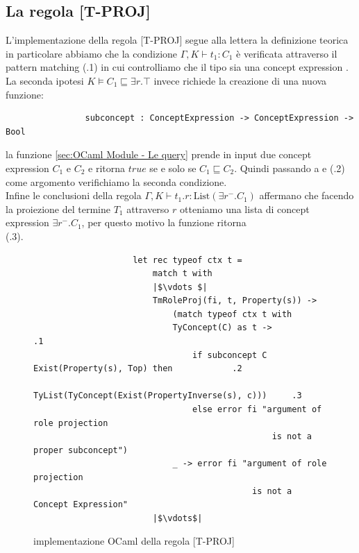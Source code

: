         \subsection{La regola [T-PROJ]}
            L'implementazione della regola [T-PROJ] segue alla lettera la definizione teorica in particolare abbiamo che la condizione $\Gamma,K \vdash t_1 : C_1$
            è verificata attraverso il pattern matching (.1) in cui controlliamo che il tipo  sia una concept expression . La seconda ipotesi
            $K \vDash C_1 \sqsubseteq \exists r . \top$ invece richiede la creazione di una nuova funzione:
            \begin{verbatim}
                subconcept : ConceptExpression -> ConceptExpression -> Bool
            \end{verbatim}
            la funzione  \ref{sec:OCaml Module - Le query} prende in input due concept expression $C_1$ e $C_2$ e ritorna $true$ se e solo se $C_1 \sqsubseteq C_2$. Quindi passando a 
             e  (.2) come argomento verifichiamo la seconda condizione.
            \\Infine le conclusioni della regola $\Gamma,K \vdash t_1.r : \textrm{List}(\exists r^- . C_1)$ affermano che facendo la proiezione del termine $T_1$ attraverso $r$
            otteniamo una lista di concept expression $\exists r^- . C_1$, per questo motivo la funzione  ritorna \\ (.3).
            \begin{figure}[h] 
                \begin{verbatim}
                    let rec typeof ctx t =
                        match t with
                        |$\vdots $|
                        TmRoleProj(fi, t, Property(s)) ->
                            (match typeof ctx t with
                            TyConcept(C) as t ->                                        .1
                                if subconcept C Exist(Property(s), Top) then            .2
                                    TyList(TyConcept(Exist(PropertyInverse(s), c)))     .3
                                else error fi "argument of role projection 
                                                is not a proper subconcept")
                            _ -> error fi "argument of role projection 
                                            is not a Concept Expression"
                        |$\vdots$|
                \end{verbatim}
            \caption{implementazione OCaml della regola [T-PROJ]}
            \end{figure}

